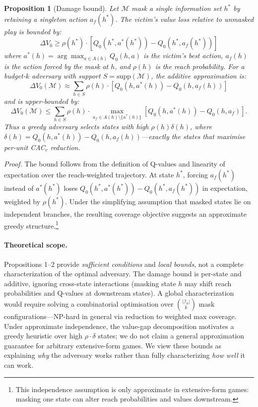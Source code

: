\documentclass{article}
\newtheorem{proposition}{Proposition}
\begin{document}
\begin{proposition}[Damage bound]
Let $\mathcal{M}$ mask a single information set $h^*$ by retaining a singleton action $a_f(h^*)$. The victim's value loss relative to unmasked play is bounded by:
\[
\Delta V_0 \geq \rho(h^*) \cdot [Q_0(h^*, a^*(h^*)) - Q_0(h^*, a_f(h^*))]
\]
where $a^*(h)=\arg\max_{a\in A(h)} Q_0(h,a)$ is the victim's best action, $a_f(h)$ is the action forced by the mask at $h$, and $\rho(h)$ is the reach probability. For a budget-$k$ adversary with support $S=\text{supp}(\mathcal{M})$, the additive approximation is:
\[
\Delta V_0(\mathcal{M}) \approx
\sum_{h \in S} \rho(h) \cdot [Q_0(h,a^*(h)) - Q_0(h,a_f(h))]
\]
and is upper-bounded by:
\[
\Delta V_0(\mathcal{M}) \leq
\sum_{h \in S} \rho(h) \cdot \max_{a_f \in A(h)\setminus\{a^*(h)\}}
[Q_0(h,a^*(h)) - Q_0(h,a_f)].
\]
Thus a greedy adversary selects states with high $\rho(h)\delta(h)$, where $\delta(h)=Q_0(h,a^*(h))-Q_0(h,a_f(h))$---exactly the states that maximise per-unit CAC$_v$ reduction.
\end{proposition}

\emph{Proof.} The bound follows from the definition of Q-values and linearity of expectation over the reach-weighted trajectory. At state $h^*$, forcing $a_f(h^*)$ instead of $a^*(h^*)$ loses $Q_0(h^*,a^*(h^*)) - Q_0(h^*,a_f(h^*))$ in expectation, weighted by $\rho(h^*)$. Under the simplifying assumption that masked states lie on independent branches, the resulting coverage objective suggests an approximate greedy structure.\footnote{This independence assumption is only approximate in extensive-form games: masking one state can alter reach probabilities and values downstream.}

\paragraph{Theoretical scope.}
Propositions 1--2 provide \emph{sufficient conditions} and \emph{local bounds}, not a complete characterization of the optimal adversary. The damage bound is per-state and additive, ignoring cross-state interactions (masking state $h$ may shift reach probabilities and Q-values at downstream states). A global characterization would require solving a combinatorial optimisation over $\binom{|\mathcal{I}_0|}{k}$ mask configurations---NP-hard in general via reduction to weighted max coverage. Under approximate independence, the value-gap decomposition motivates a greedy heuristic over high $\rho \cdot \delta$ states; we do not claim a general approximation guarantee for arbitrary extensive-form games. We view these bounds as explaining \emph{why} the adversary works rather than fully characterizing \emph{how well} it can work.
\end{document}
